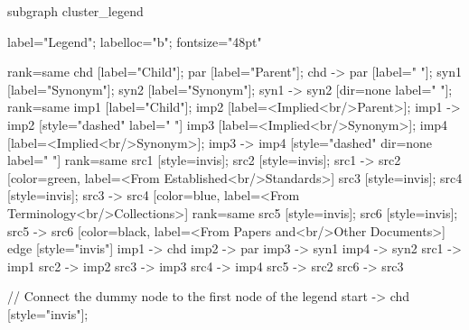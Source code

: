 \documentclass{article}
\begin{document}
{subgraph cluster_legend {

    label="Legend";
    labelloc="b";
    fontsize="48pt"

    {
        rank=same
        chd [label="Child"];
        par [label="Parent"];
        chd -> par [label="                "];
        syn1 [label="Synonym"];
        syn2 [label="Synonym"];
        syn1 -> syn2 [dir=none label="                "];
    }
    {
        rank=same
        imp1 [label="Child"];
        imp2 [label=<Implied<br/>Parent>];
        imp1 -> imp2 [style="dashed" label="                "]
        imp3 [label=<Implied<br/>Synonym>];
        imp4 [label=<Implied<br/>Synonym>];
        imp3 -> imp4 [style="dashed" dir=none label="                "]
    }
{
rank=same
src1 [style=invis];
src2 [style=invis];
src1 -> src2 [color=green, label=<From Established<br/>Standards>]
src3 [style=invis];
src4 [style=invis];
src3 -> src4 [color=blue, label=<From Terminology<br/>Collections>]
}
{
rank=same
src5 [style=invis];
src6 [style=invis];
src5 -> src6 [color=black, label=<From Papers and<br/>Other Documents>]
}
edge [style="invis"]
imp1 -> chd
imp2 -> par
imp3 -> syn1
imp4 -> syn2
src1 -> imp1
src2 -> imp2
src3 -> imp3
src4 -> imp4
src5 -> src2
src6 -> src3
}

// Connect the dummy node to the first node of the legend
start -> chd [style="invis"];
}
\end{document}
